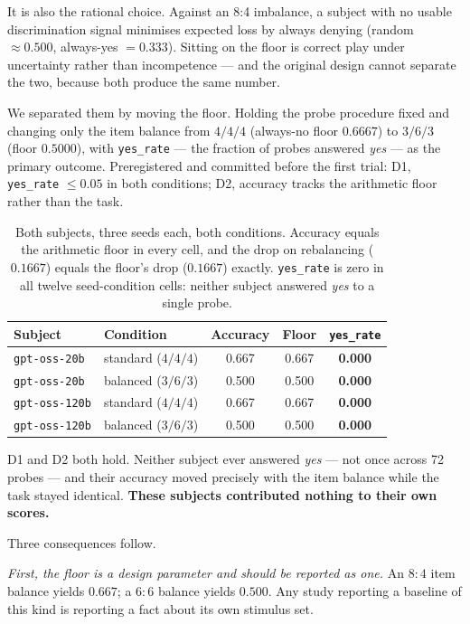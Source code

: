\documentclass[11pt]{article}
\begin{document}
It is also the rational choice. Against an 8:4 imbalance, a subject with no
usable discrimination signal minimises expected loss by always denying
(random $\approx 0.500$, always-yes $=0.333$). Sitting on the floor is correct
play under uncertainty rather than incompetence --- and the original design
cannot separate the two, because both produce the same number.

We separated them by moving the floor. Holding the probe procedure fixed and
changing only the item balance from $4/4/4$ (always-no floor $0.6667$) to
$3/6/3$ (floor $0.5000$), with \texttt{yes\_rate} --- the fraction of probes
answered \emph{yes} --- as the primary outcome. Preregistered and committed
before the first trial: D1, \texttt{yes\_rate} $\leq 0.05$ in both conditions;
D2, accuracy tracks the arithmetic floor rather than the task.

\begin{table}[h]
\centering
\begin{tabular}{llccc}
\toprule
Subject & Condition & Accuracy & Floor & \texttt{yes\_rate} \\
\midrule
\texttt{gpt-oss-20b} & standard ($4/4/4$) & 0.667 & 0.667 & \textbf{0.000} \\
\texttt{gpt-oss-20b} & balanced ($3/6/3$) & 0.500 & 0.500 & \textbf{0.000} \\
\texttt{gpt-oss-120b} & standard ($4/4/4$) & 0.667 & 0.667 & \textbf{0.000} \\
\texttt{gpt-oss-120b} & balanced ($3/6/3$) & 0.500 & 0.500 & \textbf{0.000} \\
\bottomrule
\end{tabular}
\caption{Both subjects, three seeds each, both conditions. Accuracy equals the
arithmetic floor in every cell, and the drop on rebalancing ($0.1667$) equals
the floor's drop ($0.1667$) exactly. \texttt{yes\_rate} is zero in all twelve
seed-condition cells: neither subject answered \emph{yes} to a single probe.}
\label{tab:floor}
\end{table}

D1 and D2 both hold. Neither subject ever answered \emph{yes} --- not once
across 72 probes --- and their accuracy moved precisely with the item balance
while the task stayed identical. \textbf{These subjects contributed nothing to
their own scores.}

Three consequences follow.

\emph{First, the floor is a design parameter and should be reported as one.}
An $8{:}4$ item balance yields $0.667$; a $6{:}6$ balance yields $0.500$. Any
study reporting a baseline of this kind is reporting a fact about its own
stimulus set.
\end{document}
